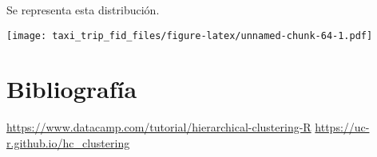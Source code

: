 \documentclass[
]{article}
\newenvironment{Shaded}{\begin{snugshade}}{\end{snugshade}}
\newcommand{\AttributeTok}[1]{\textcolor[rgb]{0.77,0.63,0.00}{#1}}
\newcommand{\FunctionTok}[1]{\textcolor[rgb]{0.00,0.00,0.00}{#1}}
\newcommand{\NormalTok}[1]{#1}
\newcommand{\SpecialCharTok}[1]{\textcolor[rgb]{0.00,0.00,0.00}{#1}}
\begin{document}
Se representa esta distribución.

\begin{Shaded}
\end{Shaded}

\texttt{[image: taxi\_trip\_fid\_files/figure-latex/unnamed-chunk-64-1.pdf]}

\hypertarget{bibliografuxeda}{%
\section{Bibliografía}\label{bibliografuxeda}}

\url{https://www.datacamp.com/tutorial/hierarchical-clustering-R}
\url{https://uc-r.github.io/hc_clustering}
\end{document}
